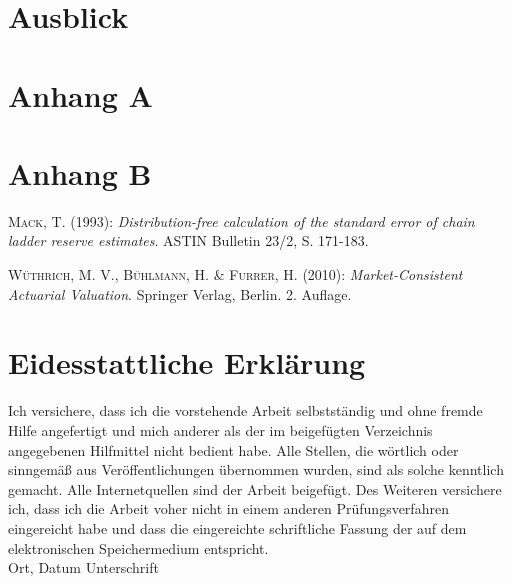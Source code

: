 ﻿\documentclass[a4paper,titlepage]{article}
\numberwithin{equation}{section} %
\begin{document}
\section{Ausblick}
\newpage


\section*{Anhang A}

\newpage


\section*{Anhang B}

\newpage



\begingroup
{}
\renewcommand*\refname{Literaturverzeichnis}

\begin{thebibliography}{----}

\textsc{Mack}, T. (1993): {\it Distribution-free calculation of the standard error of chain ladder reserve estimates}. ASTIN Bulletin 23/2, S. 171-183.

\textsc{Wüthrich}, M. V., \textsc{Bühlmann}, H. \& \textsc{Furrer}, H. (2010): {\it Market-Consistent Actuarial Valuation}. Springer Verlag, Berlin. 2. Auflage.
\end{thebibliography}
\endgroup

\newpage


\section*{Eidesstattliche Erklärung}

\glqq Ich versichere, dass ich die vorstehende Arbeit selbstständig und
ohne fremde Hilfe angefertigt und mich anderer als der im beigefügten
Verzeichnis angegebenen Hilfmittel nicht bedient habe. Alle Stellen, die
wörtlich oder sinngemäß aus Veröffentlichungen übernommen wurden, sind als
solche kenntlich gemacht. Alle Internetquellen sind der Arbeit beigefügt.
Des Weiteren versichere ich, dass ich die Arbeit voher nicht in einem anderen
Prüfungsverfahren eingereicht habe und dass die eingereichte schriftliche Fassung
der auf dem elektronischen Speichermedium entspricht.\grqq 
~\\[20mm]
Ort, Datum\hspace{4cm} Unterschrift
\end{document}
